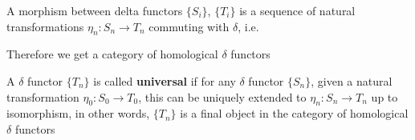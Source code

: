 \documentclass[../main.tex]{subfiles}
\begin{document}
\begin{definition}
A morphism between delta functors $\{S_i\}$, $\{T_i\}$ is a sequence of natural transformations $\eta_n:S_n\to T_n$ commuting with $\delta$, i.e.
\begin{center}
\end{center}
Therefore we get a category of homological $\delta$ functors
\end{definition}

\begin{definition}
A $\delta$ functor $\{T_n\}$ is called \textbf{universal} if for any $\delta$ functor $\{S_n\}$, given a natural transformation $\eta_0:S_0\to T_0$, this can be uniquely extended to $\eta_n:S_n\to T_n$ up to isomorphism, in other words, $\{T_n\}$ is a final object in the category of homological $\delta$ functors
\end{definition}
\end{document}
